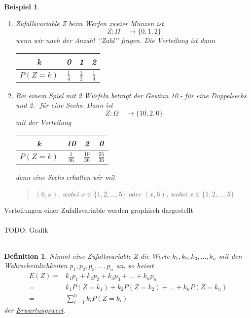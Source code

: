 \documentclass{report}
\newtheorem{mydef}{Definition}
\newtheorem{myexample}{Beispiel}
\begin{document}
\begin{myexample}
\begin{enumerate}
\item
Zufallsvariable Z beim Werfen zweier Münzen ist
\begin{equation}
Z: \Omega \quad \longrightarrow \{0,1,2\}
\end{equation}
wenn wir nach der Anzahl \lq\lq{}Zahl\rq\rq{} fragen. Die Verteilung ist dann
\begin{center}\begin{tabular}{c | c c c}
k & 0 & 1 & 2\\
\hline
$P(Z=k)$ & $\frac{1}{4}$ & $\frac{1}{2}$ & $\frac{1}{4}$
\end{tabular}\end{center}
\item
Bei einem Spiel mit 2 Würfeln beträgt der Gewinn 10.- für eine Doppelsechs und 2.- für eine Sechs. Dann ist
\begin{equation}
Z: \Omega \quad \longrightarrow \{10,2,0\}
\end{equation}
mit der Verteilung
\begin{center}\begin{tabular}{c | c c c}
k & 10 & 2 & 0\\
\hline
$P(Z=k)$ & $\frac{1}{36}$ & $\frac{10}{36}$ & $\frac{25}{36}$
\end{tabular}\end{center}
denn eine Sechs erhalten wir mit
\begin{quote}
$(6,x)$, wobei $x \in \{1,2,...,5\}$ oder
$(x,6)$, wobei $x \in \{1,2,...,5\}$
\end{quote}
\end{enumerate}
\end{myexample}
Verteilungen einer Zufallsvariable werden graphisch dargestellt
\\\\TODO: Grafik\\\\
\begin{mydef}
Nimmt eine Zufallsvariable Z die Werte $k_1, k_2, k_3, ..., k_n$ mit den Wahrscheinlichkeiten $p_1, p_2, p_3, ..., p_n$ an, so heisst
\begin{align*}
E(Z) = & k_1p_1 + k_2p_2 + k_3p_3 + ... + k_np_n\\
= & k_1 P(Z=k_1) + k_2 P(Z=k_2) + ... + k_n P(Z=k_n)\\
= & \sum_{i=1}^n{k_i P(Z=k_i)}
\end{align*}
der \underline{Erwartungswert}.
\end{mydef}
\end{document}
